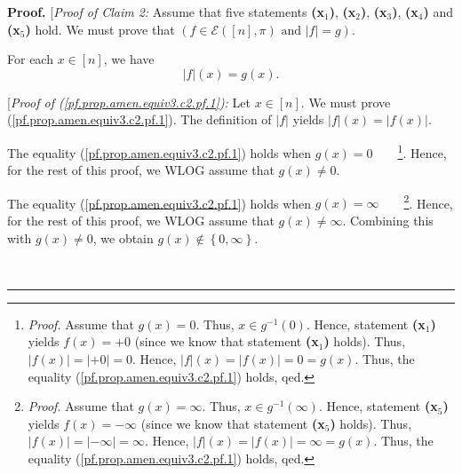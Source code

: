 \documentclass[numbers=enddot,12pt,final,onecolumn,notitlepage]{scrartcl}%
\theoremstyle{definition}
\newenvironment{proof}[1][Proof]{\noindent\textbf{#1.} }{\ \rule{0.5em}{0.5em}}
\newenvironment{verlong}{}{}
\begin{document}
\begin{verlong}
\begin{proof}
[\textit{Proof of Claim 2:} Assume that five statements \textbf{(x}$_{1}%
$\textbf{)}, \textbf{(x}$_{2}$\textbf{)}, \textbf{(x}$_{3}$\textbf{)},
\textbf{(x}$_{4}$\textbf{)} and \textbf{(x}$_{5}$\textbf{)} hold. We must
prove that $\left(  f\in\mathcal{E}\left(  \left[  n\right]  ,\pi\right)
\text{ and }\left\vert f\right\vert =g\right)  $.

For each $x\in\left[  n\right]  $, we have
\begin{equation}
\left\vert f\right\vert \left(  x\right)  =g\left(  x\right)  .
\label{pf.prop.amen.equiv3.c2.pf.1}%
\end{equation}


[\textit{Proof of (\ref{pf.prop.amen.equiv3.c2.pf.1}):} Let $x\in\left[
n\right]  $. We must prove (\ref{pf.prop.amen.equiv3.c2.pf.1}). The definition
of $\left\vert f\right\vert $ yields $\left\vert f\right\vert \left(
x\right)  =\left\vert f\left(  x\right)  \right\vert $.

The equality (\ref{pf.prop.amen.equiv3.c2.pf.1}) holds when $g\left(
x\right)  =0$\ \ \ \ \footnote{\textit{Proof.} Assume that $g\left(  x\right)
=0$. Thus, $x\in g^{-1}\left(  0\right)  $. Hence, statement \textbf{(x}$_{1}%
$\textbf{)} yields $f\left(  x\right)  =+0$ (since we know that statement
\textbf{(x}$_{1}$\textbf{)} holds). Thus, $\left\vert f\left(  x\right)
\right\vert =\left\vert +0\right\vert =0$. Hence, $\left\vert f\right\vert
\left(  x\right)  =\left\vert f\left(  x\right)  \right\vert =0=g\left(
x\right)  $. Thus, the equality (\ref{pf.prop.amen.equiv3.c2.pf.1}) holds,
qed.}. Hence, for the rest of this proof, we WLOG assume that $g\left(
x\right)  \neq0$.

The equality (\ref{pf.prop.amen.equiv3.c2.pf.1}) holds when $g\left(
x\right)  =\infty$\ \ \ \ \footnote{\textit{Proof.} Assume that $g\left(
x\right)  =\infty$. Thus, $x\in g^{-1}\left(  \infty\right)  $. Hence,
statement \textbf{(x}$_{5}$\textbf{)} yields $f\left(  x\right)  =-\infty$
(since we know that statement \textbf{(x}$_{5}$\textbf{)} holds). Thus,
$\left\vert f\left(  x\right)  \right\vert =\left\vert -\infty\right\vert
=\infty$. Hence, $\left\vert f\right\vert \left(  x\right)  =\left\vert
f\left(  x\right)  \right\vert =\infty=g\left(  x\right)  $. Thus, the
equality (\ref{pf.prop.amen.equiv3.c2.pf.1}) holds, qed.}. Hence, for the rest
of this proof, we WLOG assume that $g\left(  x\right)  \neq\infty$. Combining
this with $g\left(  x\right)  \neq0$, we obtain $g\left(  x\right)
\notin\left\{  0,\infty\right\}  $.


\end{proof}
\end{verlong}
\end{document}
